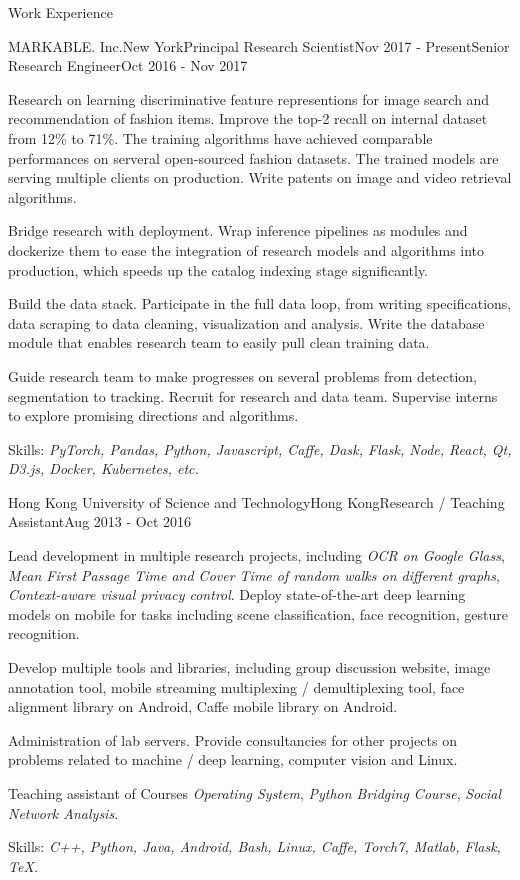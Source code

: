 \documentclass{resume} %
\begin{document}
\begin{rSection}{Work Experience}

\begin{rSubsection}{MARKABLE. Inc.}{New York}{Principal Research Scientist}{Nov 2017 - Present}{Senior Research Engineer}{Oct 2016 - Nov 2017}
\item Research on learning discriminative feature representions for image search and recommendation of fashion items. Improve the top-2 recall on internal dataset from 12\% to 71\%. The training algorithms have achieved comparable performances on serveral open-sourced fashion datasets. The trained models are serving multiple clients on production. Write patents on image and video retrieval algorithms.
\item Bridge research with deployment. Wrap inference pipelines as modules and dockerize them to ease the integration of research models and algorithms into production, which speeds up the catalog indexing stage significantly.
\item Build the data stack. Participate in the full data loop, from writing specifications, data scraping to data cleaning, visualization and analysis. Write the database module that enables research team to easily pull clean training data.
\item Guide research team to make progresses on several problems from detection, segmentation to tracking. Recruit for research and data team. Supervise interns to explore promising directions and algorithms.
\item Skills: {\it PyTorch, Pandas, Python, Javascript, Caffe, Dask, Flask, Node, React, Qt, D3.js, Docker, Kubernetes, etc.}
\end{rSubsection}

\begin{rSubsection}{Hong Kong University of Science and Technology}{Hong Kong}{Research / Teaching Assistant}{Aug 2013 - Oct 2016}{}{}
\item Lead development in multiple research projects, including {\it OCR on Google Glass}, {\it Mean First Passage Time and Cover Time of random walks on different graphs}, {\it Context-aware visual privacy control}. Deploy state-of-the-art deep learning models on mobile for tasks including scene classification, face recognition, gesture recognition.
\item Develop multiple tools and libraries, including group discussion website, image annotation tool, mobile streaming multiplexing / demultiplexing tool, face alignment library on Android, Caffe mobile library on Android.
\item Administration of lab servers. Provide consultancies for other projects on problems related to machine / deep learning, computer vision and Linux.
\item Teaching assistant of Courses {\it Operating System}, {\it Python Bridging Course}, {\it Social Network Analysis}.
\item Skills: {\it C++, Python, Java, Android, Bash, Linux, Caffe, Torch7, Matlab, Flask, \TeX.}
\end{rSubsection}


\end{rSection}
\end{document}
